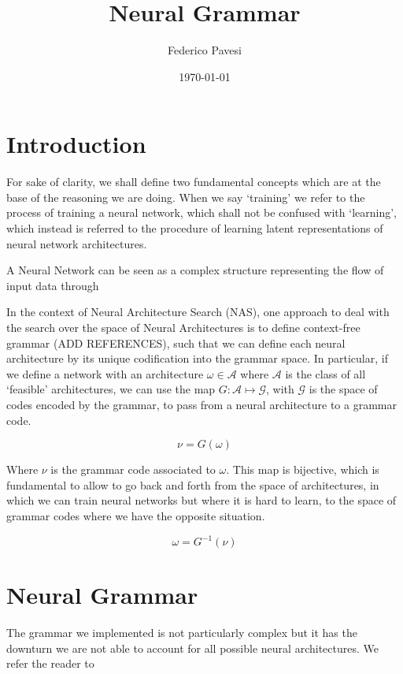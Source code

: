 \documentclass[12pt]{article}
\title{Neural Grammar}
\author{Federico Pavesi}
\date{\today}
\begin{document}
\maketitle

\section{Introduction}

For sake of clarity, we shall define two fundamental concepts which are at the base of the reasoning we 
are doing. When we say `training' we refer to the process of training a neural network, which shall not
be confused with `learning', which instead is referred to the procedure of learning latent representations
of neural network architectures. 

A Neural Network can be seen as a complex structure representing the flow of input data through

In the context of Neural Architecture Search (NAS), one approach to deal with the search over the 
space of Neural Architectures is to define context-free grammar (ADD REFERENCES), such that we can define 
each neural architecture by its unique codification into the grammar space. In particular, if we define a 
network with an architecture $\omega \in \mathcal{A}$ where $\mathcal{A}$ is the class of all `feasible' 
architectures, we can use the map $G: \mathcal{A} \mapsto \mathcal{G}$, with $\mathcal{G}$ is the space
of codes encoded by the grammar, to pass from a neural architecture to a grammar code. 

\begin{equation}
    \nu = G(\omega)
\end{equation}

Where $\nu$ is the grammar code associated to $\omega$.
This map is bijective, which is fundamental to allow to go back and forth from the space of architectures, 
in which we can train neural networks but where it is hard to learn, to the space of grammar codes where we have 
the opposite situation. 

\begin{equation}
    \omega = G^{-1}(\nu)
\end{equation}


\section{Neural Grammar} 
The grammar we implemented is not particularly complex but it has the downturn we are not able to account 
for all possible neural architectures. We refer the reader to 
\end{document}
